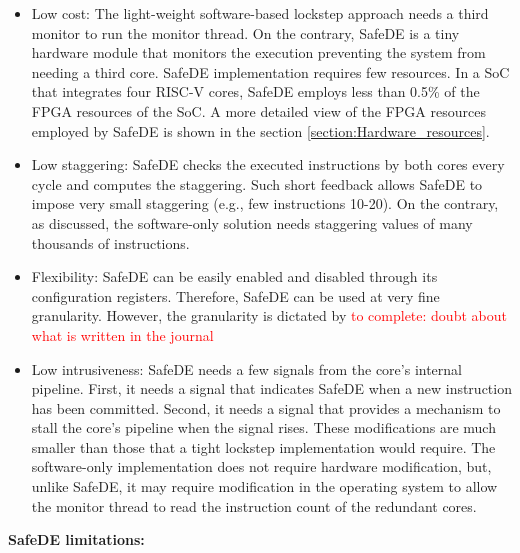 \begin{itemize}
    \item Low cost: The light-weight software-based lockstep approach needs a third monitor to run the monitor thread. On the contrary, SafeDE is a tiny hardware module that monitors the execution preventing the system from needing a third core. SafeDE implementation requires few resources. In a SoC that integrates four RISC-V cores, SafeDE employs less than 0.5\% of the FPGA resources of the SoC. A more detailed view of the FPGA resources employed by SafeDE is shown in the section \ref{section:Hardware_resources}.

    \item Low staggering: SafeDE checks the executed instructions by both cores every cycle and computes the staggering. Such short feedback allows SafeDE to impose very small staggering (e.g., few instructions 10-20). On the contrary, as discussed, the software-only solution needs staggering values of many thousands of instructions.

    \item Flexibility: SafeDE can be easily enabled and disabled through its configuration registers. Therefore, SafeDE can be used at very fine granularity. However, the granularity is dictated by \textcolor{red}{to complete: doubt about what is written in the journal}

    \item Low intrusiveness: SafeDE needs a few signals from the core's internal pipeline. First, it needs a signal that indicates SafeDE when a new instruction has been committed. Second, it needs a signal that provides a mechanism to stall the core's pipeline when the signal rises. These modifications are much smaller than those that a tight lockstep implementation would require. The software-only implementation does not require hardware modification, but, unlike SafeDE, it may require modification in the operating system to allow the monitor thread to read the instruction count of the redundant cores. 
\end{itemize}


\textbf{SafeDE limitations:}

